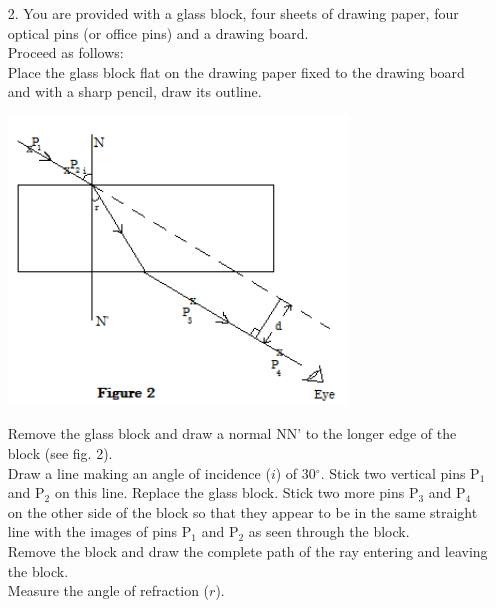 \begin{enumerate}
\item[2.] You are provided with a glass block, four sheets of drawing paper, four optical pins (or office pins) and a drawing board.\\[6pt]

Proceed as follows:\\[6pt]

Place the glass block flat on the drawing paper fixed to the drawing board and with a sharp pencil, draw its outline.

\begin{center}
\includegraphics[width=9cm]{./img/2008-2-alt.png}
\end{center}

Remove the glass block and draw a normal NN' to the longer edge of the block (see fig. 2).\\
Draw a line making an angle of incidence ($i$) of 30$^\circ$. Stick two vertical pins P$_1$ and P$_2$ on this line. Replace the glass block. Stick two more pins P$_3$ and P$_4$ on the other side of the block so that they appear to be in the same straight line with the images of pins P$_1$ and P$_2$ as seen through the block.\\
Remove the block and draw the complete path of the ray entering and leaving the block.\\
Measure the angle of refraction ($r$).\\[6pt]


\end{enumerate}
